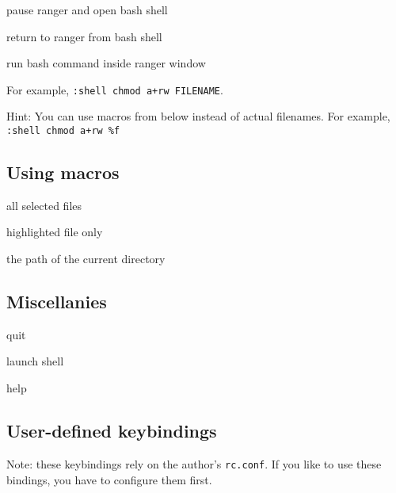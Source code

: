 \documentclass[fontsize=9pt, paper=letter, headings=normal, landscape]{scrartcl}
\newenvironment{commandlist}{\begin{description}[noitemsep]}{\end{description}}
\let\olditem\item
\renewcommand\item[1][]{\olditem[{#1}]\raggedright\dotfill}}%
\newcommand{\OR}{\underline{or} }
\begin{document}
\begin{multicols*}{3}
  \begin{commandlist}
  \item[S] pause ranger and open bash shell
  \item[exit] return to ranger from bash shell
  \end{commandlist}

  \begin{commandlist}
  \item[s \OR :shell] run bash command inside ranger window
  \item[] For example, \texttt{:shell chmod a+rw FILENAME}.
  \end{commandlist}

  Hint: You can use macros from below instead of actual filenames.
  For example, \texttt{:shell chmod a+rw \%f}

  \subsection*{Using macros}

  \begin{commandlist}
  \item[\%s] all selected files
  \item[\%f] highlighted file only
  \item[\%d] the path of the current directory
  \end{commandlist}

  \subsection*{Miscellanies}

  \begin{commandlist}
  \item[q] quit
  \item[s] launch shell
  \item[?] help
  \end{commandlist}

  \vspace*{\fill}
  \columnbreak

  \subsection*{User-defined keybindings}

  Note: these keybindings rely on the author's \texttt{rc.conf}. If you
  like to use these bindings, you have to configure them first.


\end{multicols*}
\end{document}
